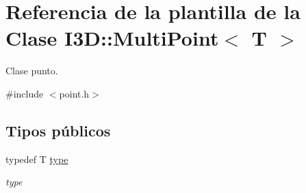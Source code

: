 \hypertarget{class_i3_d_1_1_multi_point}{}\section{Referencia de la plantilla de la Clase I3D\+:\+:Multi\+Point$<$ T $>$}
\label{class_i3_d_1_1_multi_point}


Clase punto.  




{\ttfamily \#include $<$point.\+h$>$}

\subsection*{Tipos públicos}
\begin{DoxyCompactItemize}
\item 
typedef T \hyperlink{class_i3_d_1_1_multi_point_ae8bafa5f4c3f71c19b294e5495683582}{type}
\begin{DoxyCompactList}\small\item\em type \end{DoxyCompactList}\end{DoxyCompactItemize}
